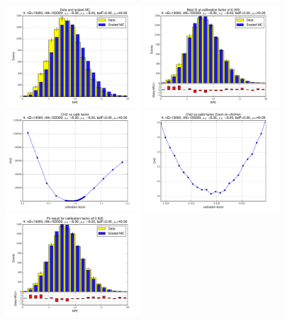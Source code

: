 
 \begin{figure}[htbp] \begin{center} 
\includegraphics[width=0.45\textwidth]{../FIGURES/04/FIG_Data_and_scaled_MC.pdf} 
\includegraphics[width=0.45\textwidth]{../FIGURES/04/FIG_Best_fit_at_calibration_factor_of_0_929.pdf} 
\includegraphics[width=0.45\textwidth]{../FIGURES/04/FIG_Chi2_vs_calib_factor.pdf} 
\includegraphics[width=0.45\textwidth]{../FIGURES/04/FIG_Chi2_vs_calib_factor_Zoom_on_chi2min.pdf} 
\includegraphics[width=0.45\textwidth]{../FIGURES/04/FIG_Fit_result_for_calibration_factor_of_0_925.pdf} 

\end{center}
\end{figure}
